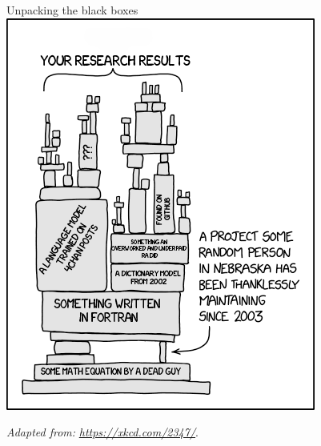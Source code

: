 \documentclass[10pt]{beamer}
\begin{document}
\begin{frame}[fragile]{Unpacking the black boxes}  
    \includegraphics[scale=0.4]{dependency_cssh}
    \centering
    
    \textit{Adapted from:} \href{https://xkcd.com/2347/}{\textit{https://xkcd.com/2347/}}.
    \centering

\end{frame}
\end{document}
